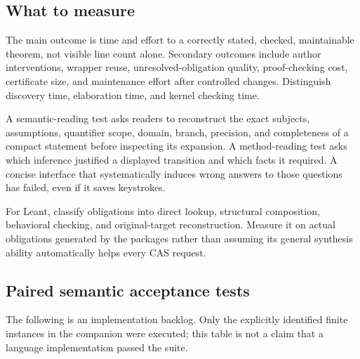 \documentclass[11pt,a4paper]{article}
\theoremstyle{plain}
\theoremstyle{definition}
\theoremstyle{remark}
\begin{document}
\subsection{What to measure}
The main outcome is time and effort to a correctly stated, checked, maintainable
theorem, not visible line count alone. Secondary outcomes include author
interventions, wrapper reuse, unresolved-obligation quality, proof-checking
cost, certificate size, and maintenance effort after controlled changes.
Distinguish discovery time, elaboration time, and kernel checking time.

A semantic-reading test asks readers to reconstruct the exact subjects,
assumptions, quantifier scope, domain, branch, precision, and completeness of a
compact statement before inspecting its expansion. A method-reading test asks
which inference justified a displayed transition and which facts it required.
A concise interface that systematically induces wrong answers to those
questions has failed, even if it saves keystrokes.

For Leant, classify obligations into direct lookup, structural composition,
behavioral checking, and original-target reconstruction. Measure it on actual
obligations generated by the packages rather than assuming its general
synthesis ability automatically helps every CAS request.

\subsection{Paired semantic acceptance tests}
The following is an implementation backlog. Only the explicitly identified
finite instances in the companion were executed; this table is not a claim
that a language implementation passed the suite.
\end{document}
